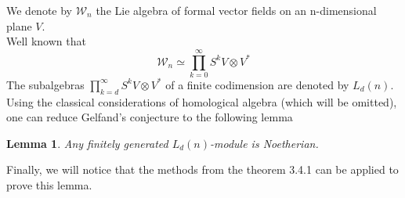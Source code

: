 \documentclass[12pt,a4paper]{article}
\newtheorem{lemma}{Lemma}[subsection]
\begin{document}
    We denote by $\mathcal{W}_n$ the Lie algebra of formal vector fields on an n-dimensional plane $V$.\\
    Well known that
    \[\mathcal{W}_n\simeq \prod\limits_{k=0}^{\infty}S^k V\otimes V^*\]
    The subalgebras $\prod\limits_{k=d}^{\infty}S^k V\otimes V^*$ of a finite codimension are denoted by $L_d(n)$.
    Using the classical considerations of homological algebra (which will be omitted), one can reduce Gelfand's conjecture to the following lemma
    \vskip 0.1in\noindent
    \begin{lemma}
        Any finitely generated $L_d(n)$-module is Noetherian.
    \end{lemma}
    \vskip 0.1in\noindent

    Finally, we will notice that the methods from the theorem 3.4.1 can be applied to prove this lemma.


    
    
\end{document}
